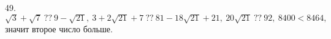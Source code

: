 49. $\sqrt{3}+\sqrt{7}\ ??\ 9-\sqrt{21},\ 3+2\sqrt{21}+7\ ??\ 81-18\sqrt{21}+21,\ 20\sqrt{21}\ ??\ 92,\ 8400 <8464,$ значит второе число больше.\\
